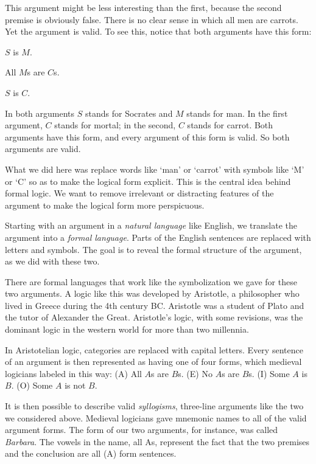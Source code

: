 This argument might be less interesting than the first, because the second premise is obviously false. There is no clear sense in which all men are carrots. Yet the argument is valid. To see this, notice that both arguments have this form:

\begin{earg}
\item[] $S$ is $M$.
\item[] All $M$s are $C$s.
\item[\therefore] $S$ is $C$.
\end{earg}

In both arguments $S$ stands for Socrates and $M$ stands for man. In the first argument, $C$ stands for mortal; in the second, $C$ stands for carrot. Both arguments have this form, and every argument of this form is valid. So both arguments are valid.


What we did here was replace words like `man' or `carrot' with symbols like `M' or `C' so as to make the logical form explicit. This is the central idea behind formal logic. We want to remove irrelevant or distracting features of the argument to make the logical form more perspicuous.

Starting with an argument in a \emph{natural language} like English, we translate the argument into a \emph{formal language}. Parts of the English sentences are replaced with letters and symbols. The goal is to reveal the formal structure of the argument, as we did with these two.

There are formal languages that work like the symbolization we gave for these two arguments. A logic like this was developed by Aristotle, a philosopher who lived in Greece during the 4th century BC. Aristotle was a student of Plato and the tutor of Alexander the Great. Aristotle's logic, with some revisions, was the dominant logic in the western world for more than two millennia.

In Aristotelian logic, categories are replaced with capital letters. Every sentence of an argument is then represented as having one of four forms, which medieval logicians labeled in this way: (A) All $A$s are $B$s. (E) No $A$s are $B$s. (I) Some $A$ is $B$. (O) Some $A$ is not $B$.

It is then possible to describe valid \emph{syllogisms}, three-line arguments like the two we considered above. Medieval logicians gave mnemonic names to all of the valid argument forms. The form of our two arguments, for instance, was called \emph{Barbara}. The vowels in the name, all As, represent the fact that the two premises and the conclusion are all (A) form sentences.

